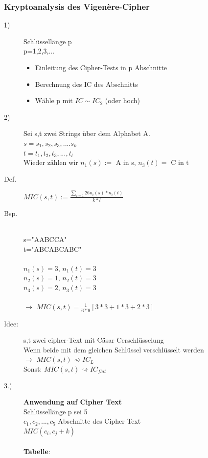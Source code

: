 \documentclass[10pt]{article}
\newcommand{\ra}{\rightarrow}
\begin{document}
\subsubsection{Kryptoanalysis des Vigen\`{e}re-Cipher}
\begin{description}
	\item[1)] Schlüssellänge p\\
		p=1,2,3,...
		\begin{itemize}
			\item Einleitung des Cipher-Tests in p Abschnitte
			\item Berechnung des IC des Abschnitts
			\item Wähle p mit $IC\sim IC_2$ (oder hoch)
		\end{itemize}
	\item[2)] Sei s,t zwei  Strings über dem Alphabet A. \\
		$s=s_1,s_2,s_3, .... s_k$ \\
		$t=t_1,t_2,t_3, ..., t_l$ \\
		Wieder zählen wir $n_1(s) :=$ A in s, $n_3(t)=$ C in t
	\item[Def.] $MIC(s,t):=\frac{\sum_{i=1}{26}n_i(s)*n_i(t)}{k*l}$ \\
	\item[Bsp.] \hfill \\
		s="{}AABCCA" \\
		t="ABCABCABC" \\
		\\
		$n_1(s)=3$, $n_1(t)=3$ \\
		$n_2(s)=1$, $n_2(t)=3$ \\
		$n_3(s)=2$, $n_3(t)=3$ \\ \\
		$\ra$ $MIC(s,t)=\frac{1}{6*9}[3*3+1*3+2*3]$
	\item[Idee:] s,t zwei cipher-Text mit Cäsar Cerschlüsselung \\
		Wenn beide mit dem gleichen Schlüssel verschlüsselt werden \\
		$\ra$ $MIC(s,t)\rightsquigarrow IC_L$ \\
		Sonst: $MIC(s,t)\rightsquigarrow IC_{flat}$
	\item[3.)] \textbf{Anwendung auf Cipher Text} \\
		Schlüssellänge p sei 5 \\
		$c_1,c_2, ...,c_5$ Abschnitte des Cipher Text \\
		$MIC(c_i,c_j+k)$ \\ \\
		\textbf{Tabelle}:  \\

\end{description}
\end{document}

